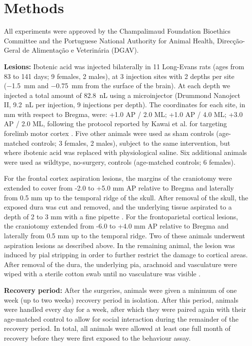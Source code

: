 \section{Methods}

All experiments were approved by the Champalimaud Foundation Bioethics Committee and the Portuguese National Authority for Animal Health, Direcção\hyp{}Geral de Alimentação e Veterinária (DGAV).

\textbf{Lesions:} Ibotenic acid was injected bilaterally in 11 Long-Evans rats (ages from 83 to 141 days; 9 females, 2 males), at 3 injection sites with 2 depths per site (\SI{-1.5}{\milli\meter} and \SI{-0.75}{\milli\meter} from the surface of the brain). At each depth we injected a total amount of \SI{82.8}{\nano\liter} using a microinjector (Drummond Nanoject II, \SI{9.2}{\nano\liter} per injection, 9 injections per depth). The coordinates for each site, in \si{\milli\meter} with respect to Bregma, were: +1.0 AP / 2.0 ML; +1.0 AP / 4.0 ML; +3.0 AP / 2.0 ML, following the protocol reported by Kawai et al. for targeting forelimb motor cortex \cite{Kawai2015}. Five other animals were used as sham controls (age-matched controls; 3 females, 2 males), subject to the same intervention, but where ibotenic acid was replaced with physiological saline. Six additional animals were used as wildtype, no-surgery, controls (age-matched controls; 6 females).

For the frontal cortex aspiration lesions, the margins of the craniotomy were extended to cover from -2.0 to +5.0 \si{\milli\meter} AP relative to Bregma and laterally from 0.5 \si{\milli\meter} up to the temporal ridge of the skull. After removal of the skull, the exposed dura was cut and removed, and the underlying tissue aspirated to a depth of 2 to 3 \si{\milli\meter} with a fine pipette \cite{Whishaw2000}. For the frontoparietal cortical lesions, the craniotomy extended from -6.0 to +4.0 \si{\milli\meter} AP relative to Bregma and laterally from 0.5 \si{\milli\meter} up to the temporal ridge. Two of these animals underwent aspiration lesions as described above. In the remaining animal, the lesion was induced by pial stripping in order to further restrict the damage to cortical areas. After removal of the dura, the underlying pia, arachnoid and vasculature were wiped with a sterile cotton swab until no vasculature was visible \cite{Farr2002}.

\textbf{Recovery period:} After the surgeries, animals were given a minimum of one week (up to two weeks) recovery period in isolation. After this period, animals were handled every day for a week, after which they were paired again with their age-matched control to allow for social interaction during the remainder of the recovery period. In total, all animals were allowed at least one full month of recovery before they were first exposed to the behaviour assay.

